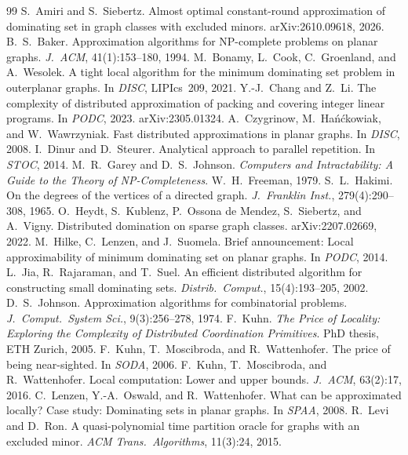 \documentclass[11pt]{article}
\theoremstyle{remark}
\begin{document}
\begin{thebibliography}{99}
 S.~Amiri and S.~Siebertz. Almost optimal constant-round approximation of dominating
  set in graph classes with excluded minors. arXiv:2610.09618, 2026.
 B.~S.~Baker. Approximation algorithms for NP-complete problems on planar graphs.
  \emph{J.\ ACM}, 41(1):153--180, 1994.
 M.~Bonamy, L.~Cook, C.~Groenland, and A.~Wesolek. A tight local algorithm for the minimum
  dominating set problem in outerplanar graphs. In \emph{DISC}, LIPIcs~209, 2021.
 Y.-J.~Chang and Z.~Li. The complexity of distributed approximation of packing and
  covering integer linear programs. In \emph{PODC}, 2023. arXiv:2305.01324.
 A.~Czygrinow, M.~Ha\'n\'ckowiak, and W.~Wawrzyniak. Fast distributed approximations
  in planar graphs. In \emph{DISC}, 2008.
 I.~Dinur and D.~Steurer. Analytical approach to parallel repetition. In \emph{STOC},
  2014.
 M.~R.~Garey and D.~S.~Johnson. \emph{Computers and Intractability: A Guide to the
  Theory of NP-Completeness}. W.~H.~Freeman, 1979.
 S.~L.~Hakimi. On the degrees of the vertices of a directed graph. \emph{J.\ Franklin
  Inst.}, 279(4):290--308, 1965.
 O.~Heydt, S.~Kublenz, P.~Ossona de Mendez, S.~Siebertz, and A.~Vigny. Distributed
  domination on sparse graph classes. arXiv:2207.02669, 2022.
 M.~Hilke, C.~Lenzen, and J.~Suomela. Brief announcement: Local approximability of
  minimum dominating set on planar graphs. In \emph{PODC}, 2014.
 L.~Jia, R.~Rajaraman, and T.~Suel. An efficient distributed algorithm for
  constructing small dominating sets. \emph{Distrib.\ Comput.}, 15(4):193--205, 2002.
 D.~S.~Johnson. Approximation algorithms for combinatorial problems. \emph{J.\ Comput.\
  System Sci.}, 9(3):256--278, 1974.
 F.~Kuhn. \emph{The Price of Locality: Exploring the Complexity of Distributed
  Coordination Primitives}. PhD thesis, ETH Zurich, 2005.
 F.~Kuhn, T.~Moscibroda, and R.~Wattenhofer. The price of being near-sighted. In
  \emph{SODA}, 2006.
 F.~Kuhn, T.~Moscibroda, and R.~Wattenhofer. Local computation: Lower and upper
  bounds. \emph{J.\ ACM}, 63(2):17, 2016.
 C.~Lenzen, Y.-A.~Oswald, and R.~Wattenhofer. What can be approximated locally?
  Case study: Dominating sets in planar graphs. In \emph{SPAA}, 2008.
\bibitem{LR15} R.~Levi and D.~Ron. A quasi-polynomial time partition oracle for graphs with an
  excluded minor. \emph{ACM Trans.\ Algorithms}, 11(3):24, 2015.

\end{thebibliography}
\end{document}

